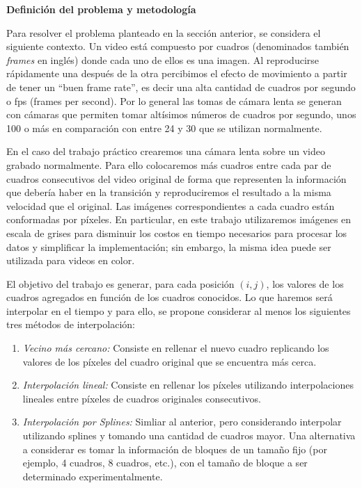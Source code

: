 \vskip 5pt

{\bf\noindent Definici\'on del problema y metodolog\'ia}

Para resolver el problema planteado en la secci\'on anterior, se considera el siguiente contexto. Un video está compuesto por cuadros (denominados también \textit{frames} en inglés) donde cada uno de ellos es una imagen. Al reproducirse rápidamente una después de la otra percibimos el efecto de movimiento a partir de tener un ``buen frame rate'', es decir una alta cantidad de cuadros por segundo o fps (frames per second). Por lo general las tomas de cámara lenta se generan con cámaras que permiten tomar altísimos números de cuadros por segundo, unos 100 o m\'as en comparaci\'on con entre 24 y 30 que se utilizan normalmente.

En el caso del trabajo práctico crearemos una cámara lenta sobre un video grabado normalmente. Para ello colocaremos más cuadros entre cada par de cuadros consecutivos del video original de forma que representen la información que debería haber en la transición y reproduciremos el resultado a la misma velocidad que el original. Las im\'agenes correspondientes a cada cuadro est\'an conformadas por p\'ixeles. En particular, en este trabajo utilizaremos im\'agenes en escala de grises para disminuir los costos en tiempo necesarios para procesar los datos y simplificar la implementaci\'on; sin embargo, la misma idea puede ser utilizada para videos en color.

El objetivo del trabajo es generar, para cada posici\'on $(i,j)$, los valores de los cuadros agregados en funci\'on de los cuadros conocidos. Lo que haremos ser\'a interpolar en el tiempo y para ello, se propone considerar al menos los siguientes tres m\'etodos de interpolaci\'on:

\begin{enumerate}
\item \emph{Vecino m\'as cercano:} Consiste en rellenar el nuevo cuadro replicando los valores de los p\'ixeles del cuadro original que se encuentra más cerca. \label{item:nn}
\item \emph{Interpolaci\'on lineal:} Consiste en rellenar los p\'ixeles utilizando interpolaciones lineales entre p\'ixeles de cuadros originales consecutivos. \label{item:lineal}
\item \emph{Interpolaci\'on por Splines:} Simliar al anterior, pero considerando interpolar utilizando splines y tomando una cantidad de cuadros mayor. Una alternativa a considerar es tomar la informaci\'on de bloques de un tama\~no fijo (por ejemplo, 4 cuadros, 8 cuadros, etc.), con el tama\~no de bloque a ser determinado experimentalmente. \label{item:spline}
\end{enumerate}


